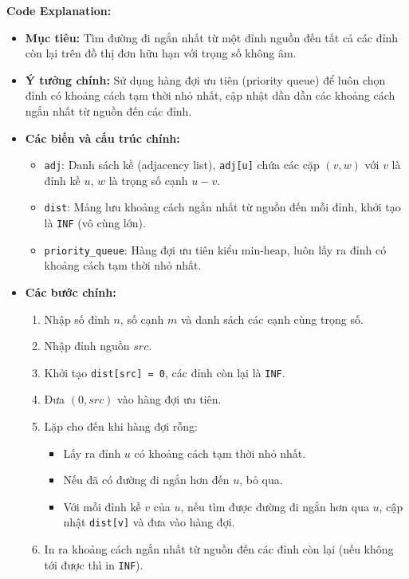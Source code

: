 \documentclass{article}
\begin{document}


\textbf{Code Explanation:}

\begin{itemize}
    \item \textbf{Mục tiêu:} Tìm đường đi ngắn nhất từ một đỉnh nguồn đến tất cả các đỉnh còn lại trên đồ thị đơn hữu hạn với trọng số không âm.
    \item \textbf{Ý tưởng chính:} Sử dụng hàng đợi ưu tiên (priority queue) để luôn chọn đỉnh có khoảng cách tạm thời nhỏ nhất, cập nhật dần dần các khoảng cách ngắn nhất từ nguồn đến các đỉnh.
    \item \textbf{Các biến và cấu trúc chính:}
    \begin{itemize}
        \item \texttt{adj}: Danh sách kề (adjacency list), \texttt{adj[u]} chứa các cặp $(v, w)$ với $v$ là đỉnh kề $u$, $w$ là trọng số cạnh $u-v$.
        \item \texttt{dist}: Mảng lưu khoảng cách ngắn nhất từ nguồn đến mỗi đỉnh, khởi tạo là \texttt{INF} (vô cùng lớn).
        \item \texttt{priority\_queue}: Hàng đợi ưu tiên kiểu min-heap, luôn lấy ra đỉnh có khoảng cách tạm thời nhỏ nhất.
    \end{itemize}
    \item \textbf{Các bước chính:}
    \begin{enumerate}
        \item Nhập số đỉnh $n$, số cạnh $m$ và danh sách các cạnh cùng trọng số.
        \item Nhập đỉnh nguồn $src$.
        \item Khởi tạo \texttt{dist[src] = 0}, các đỉnh còn lại là \texttt{INF}.
        \item Đưa $(0, src)$ vào hàng đợi ưu tiên.
        \item Lặp cho đến khi hàng đợi rỗng:
        \begin{itemize}
            \item Lấy ra đỉnh $u$ có khoảng cách tạm thời nhỏ nhất.
            \item Nếu đã có đường đi ngắn hơn đến $u$, bỏ qua.
            \item Với mỗi đỉnh kề $v$ của $u$, nếu tìm được đường đi ngắn hơn qua $u$, cập nhật \texttt{dist[v]} và đưa vào hàng đợi.
        \end{itemize}
        \item In ra khoảng cách ngắn nhất từ nguồn đến các đỉnh còn lại (nếu không tới được thì in \texttt{INF}).
    \end{enumerate}
\end{itemize}
\end{document}
